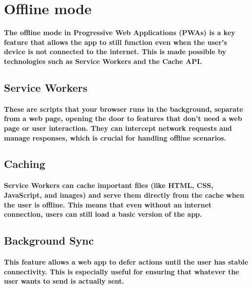 \documentclass[12pt,a4paper]{article}
\begin{document}
    \section{Offline mode}

    \paragraph{The offline mode in Progressive Web Applications (PWAs) is a key feature that allows the app to still function even when the user’s device is not connected to the internet. This is made possible by technologies such as Service Workers and the Cache API.}

    \subsection{Service Workers}

    \paragraph{These are scripts that your browser runs in the background, separate from a web page, opening the door to features that don’t need a web page or user interaction. They can intercept network requests and manage responses, which is crucial for handling offline scenarios.}

    \subsection{Caching}

    \paragraph{Service Workers can cache important files (like HTML, CSS, JavaScript, and images) and serve them directly from the cache when the user is offline. This means that even without an internet connection, users can still load a basic version of the app.}

    \subsection{Background Sync}

    \paragraph{This feature allows a web app to defer actions until the user has stable connectivity. This is especially useful for ensuring that whatever the user wants to send is actually sent.}
\end{document}
